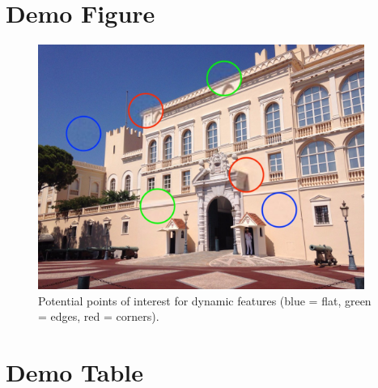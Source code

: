 \documentclass[letterpaper,12pt]{article}
\begin{document}
\begin{appendices}

\clearpage





\clearpage
\section{Demo Figure}
\label{sec:appendix-demo-figure}

\begin{figure}[h]
\centerline{\includegraphics[width=0.95\textwidth]{figures/demo_figure.jpg}}
\caption{\label{fig:demo_figure}Potential points of interest for dynamic features (blue = flat, green = edges, red = corners).}
\end{figure}


\clearpage
\section{Demo Table}
\label{sec:appendix-demo-table}




\end{appendices}
\end{document}
